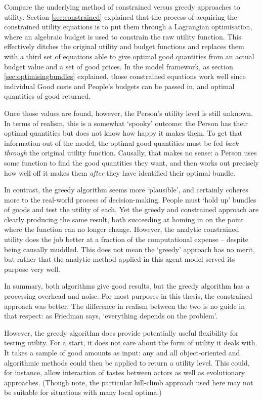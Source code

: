 Compare the underlying method of constrained versus greedy approaches to utility. Section \ref{sec:constrained} explained that the process of acquiring the constrained utility equations is to put them through a Lagrangian optimisation, where an algebraic budget is used to constrain the raw utility function. This effectively ditches the original utility and budget functions and replaces them with a third set of equations able to give optimal good quantities from an actual budget value and a set of good prices. In the model framework, as section \ref{sec:optimisingbundles} explained, those constrained equations work well since individual Good costs and People’s budgets can be passed in, and optimal quantities of good returned. 

Once those values are found, however, the Person’s utility level is still unknown. In terms of realism, this is a somewhat `spooky’ outcome: the Person has their optimal quantities but does not know how happy it makes them. To get that information out of the model, the optimal good quantities must be fed \emph{back through} the original utility function. Causally, that makes no sense: a Person uses some function to find the good quantities they want, and then works out precisely how well off it makes them \emph{after} they have identified their optimal bundle.

In contrast, the greedy algorithm seems more `plausible’, and certainly coheres more to the real-world process of decision-making. People must `hold up’ bundles of goods and test the utility of each. Yet the greedy and constrained approach are clearly producing the same result, both succeeding at homing in on the point where the function can no longer change. However, the analytic constrained utility does the job better at a fraction of the computational expense – despite being causally muddled. This does not mean the `greedy’ approach has no merit, but rather that the analytic method applied in this agent model served its purpose very well. 

In summary, both algorithms give good results, but the greedy algorithm has a processing overhead and noise. For most purposes in this thesis, the constrained approach was better. The difference in realism between the two is no guide in that respect: as Friedman says, `everything depends on the problem’. 

However, the greedy algorithm does provide potentially useful flexibility for testing utility. For a start, it does not care about the form of utility it deals with. It takes a sample of good amounts as input: any and all object-oriented and algorithmic methods could then be applied to return a utility level. This could, for instance, allow interaction of tastes between actors as well as evolutionary approaches. (Though note, the particular hill-climb approach used here may not be suitable for situations with many local optima.)

